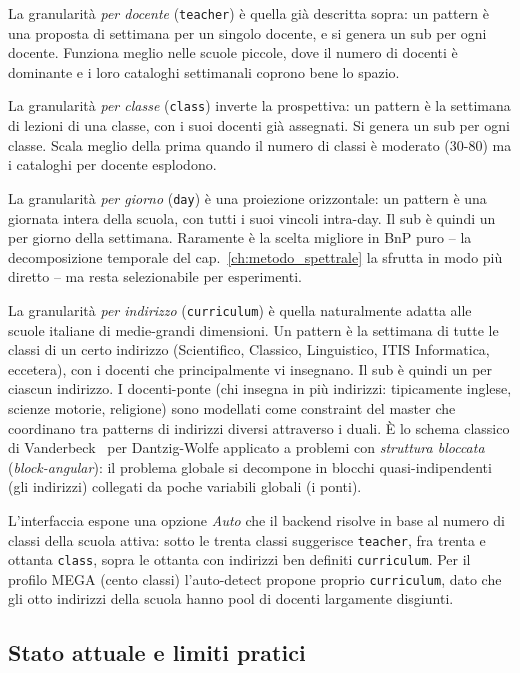 La granularit\`a \emph{per docente} (\texttt{teacher}) \`e quella
gi\`a descritta sopra: un pattern \`e una proposta di
settimana per un singolo docente, e si genera un sub per
ogni docente. Funziona meglio nelle scuole piccole, dove il
numero di docenti \`e dominante e i loro cataloghi
settimanali coprono bene lo spazio.

La granularit\`a \emph{per classe} (\texttt{class}) inverte
la prospettiva: un pattern \`e la settimana di lezioni di una
classe, con i suoi docenti gi\`a assegnati. Si genera un sub
per ogni classe. Scala meglio della prima quando il numero
di classi \`e moderato (30-80) ma i cataloghi per docente
esplodono.

La granularit\`a \emph{per giorno} (\texttt{day}) \`e una
proiezione orizzontale: un pattern \`e una giornata intera
della scuola, con tutti i suoi vincoli intra-day. Il sub
\`e quindi un per giorno della settimana. Raramente \`e la
scelta migliore in BnP puro -- la decomposizione temporale
del cap.~\ref{ch:metodo_spettrale} la sfrutta in modo pi\`u
diretto -- ma resta selezionabile per esperimenti.

La granularit\`a \emph{per indirizzo} (\texttt{curriculum})
\`e quella naturalmente adatta alle scuole italiane di
medie-grandi dimensioni. Un pattern \`e la settimana di
tutte le classi di un certo indirizzo (Scientifico,
Classico, Linguistico, ITIS Informatica, eccetera), con i
docenti che principalmente vi insegnano. Il sub \`e quindi
un per ciascun indirizzo. I docenti-ponte (chi insegna in
pi\`u indirizzi: tipicamente inglese, scienze motorie,
religione) sono modellati come constraint del master che
coordinano tra patterns di indirizzi diversi attraverso i
duali. \`E lo schema classico di
Vanderbeck~\parencite{vanderbeck2010} per Dantzig-Wolfe
applicato a problemi con \emph{struttura bloccata}
(\emph{block-angular}): il problema globale si decompone in
blocchi quasi-indipendenti (gli indirizzi) collegati da
poche variabili globali (i ponti).

L'interfaccia espone una opzione \emph{Auto} che il backend
risolve in base al numero di classi della scuola attiva:
sotto le trenta classi suggerisce \texttt{teacher},
fra trenta e ottanta \texttt{class}, sopra le ottanta con
indirizzi ben definiti \texttt{curriculum}. Per il profilo
MEGA (cento classi) l'auto-detect propone proprio
\texttt{curriculum}, dato che gli otto indirizzi della
scuola hanno pool di docenti largamente disgiunti.

\subsection{Stato attuale e limiti pratici}

